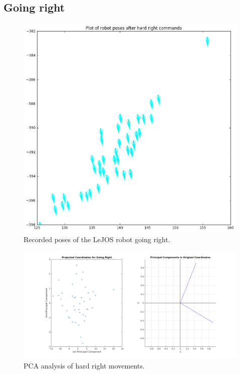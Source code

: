 \documentclass[paper=a4, fontsize=11pt]{scrartcl} %
\begin{document}
    \subsection{Going right}
    \begin{figure}[h!]
        \begin{center}
            \setlength{\fboxsep}{0.5pt} %
            \setlength{\fboxrule}{0.5pt}
            \includegraphics[width=12cm,fbox]{images/poses_plot_5_right.png}
            \caption{Recorded poses of the LeJOS robot going right.}
        \end{center}
    \end{figure}

    \begin{figure}[h!]
        \begin{center}
            \setlength{\fboxsep}{0.5pt} %
            \setlength{\fboxrule}{0.5pt}
            \includegraphics[width=\linewidth,fbox]{images/pca_Right.png}
            \caption{PCA analysis of hard right movements.}
        \end{center}
    \end{figure}
    
\end{document}

